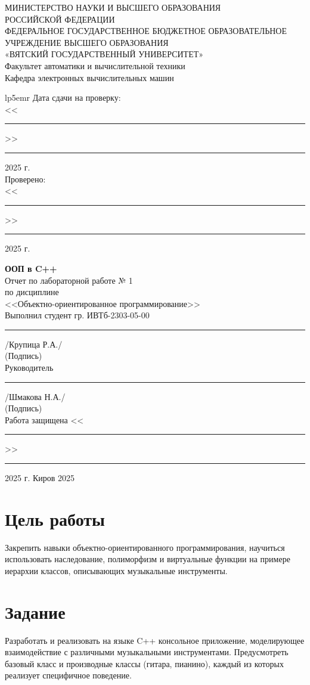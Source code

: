 \documentclass[14pt]{extarticle}
\begin{document}
\newpage\thispagestyle{empty}
\renewcommand{\figurename}{Рисунок}
\begin{center}
МИНИСТЕРСТВО НАУКИ И ВЫСШЕГО ОБРАЗОВАНИЯ \\
РОССИЙСКОЙ ФЕДЕРАЦИИ \\[2ex]
ФЕДЕРАЛЬНОЕ ГОСУДАРСТВЕННОЕ БЮДЖЕТНОЕ ОБРАЗОВАТЕЛЬНОЕ
УЧРЕЖДЕНИЕ ВЫСШЕГО ОБРАЗОВАНИЯ \\
«ВЯТСКИЙ ГОСУДАРСТВЕННЫЙ УНИВЕРСИТЕТ» \\[2ex]
Факультет автоматики и вычислительной техники \\[2ex]
Кафедра электронных вычислительных машин \\
\vfill
\mbox{}\hfill
\begin{tabular}{lp{5em}r}
Дата сдачи на проверку: \\
<<\rule[-5pt]{25pt}{0.5pt}>> \rule[-5pt]{70pt}{0.5pt} 2025 г. \\[2ex]
Проверено: \\
<<\rule[-5pt]{25pt}{0.5pt}>> \rule[-5pt]{70pt}{0.5pt} 2025 г.\\
\end{tabular}

\vfill
\textbf{ООП в C++} \\
Отчет по лабораторной работе № 1 \\
по дисциплине \\
<<Объектно-ориентированное программирование>> \\

\vfill
Выполнил студент гр. ИВТб-2303-05-00 \hfill \rule[-5pt]{0.22\linewidth}{1pt} /Крупица Р.А./ \\
\hfil {\footnotesize (Подпись)}\\[2ex]    
Руководитель \hfill \rule[-5pt]{0.22\linewidth}{1pt} /Шмакова Н.А./ \\
\hfil {\footnotesize (Подпись)}\\[2ex]

Работа защищена \hfill <<\rule[-5pt]{25pt}{0.5pt}>> \rule[-5pt]{70pt}{0.5pt} 2025 г.
\vfill
Киров 2025
\end{center}
\newpage

\section{Цель работы}
Закрепить навыки объектно-ориентированного программирования, научиться использовать наследование, полиморфизм и виртуальные функции на примере иерархии классов, описывающих музыкальные инструменты.

\section{Задание}
Разработать и реализовать на языке C++ консольное приложение, моделирующее взаимодействие с различными музыкальными инструментами. Предусмотреть базовый класс и производные классы (гитара, пианино), каждый из которых реализует специфичное поведение.
\end{document}
